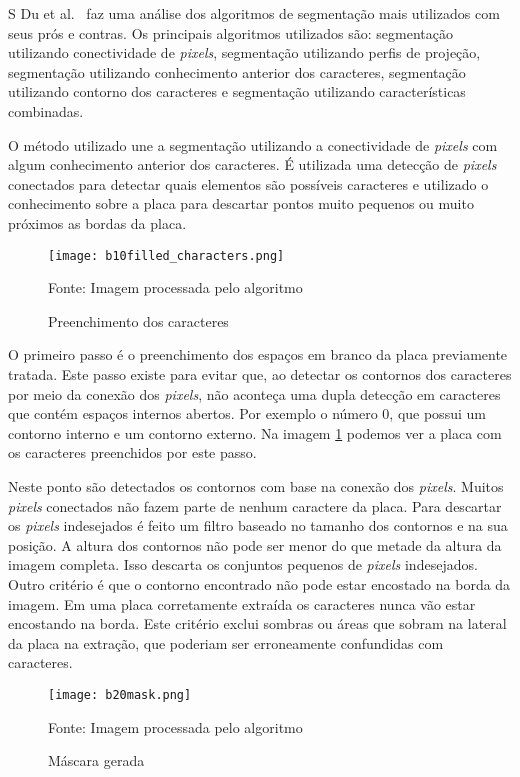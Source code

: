 S Du et al.~\cite{s2013automatic} faz uma análise dos algoritmos de segmentação mais
utilizados com seus prós e contras.  Os principais algoritmos utilizados são:
segmentação utilizando conectividade de \emph{pixels}, segmentação utilizando
perfis de projeção, segmentação utilizando conhecimento anterior dos caracteres,
segmentação utilizando contorno dos caracteres e segmentação utilizando
características combinadas.

O método utilizado une a segmentação utilizando a conectividade de \emph{pixels} com algum conhecimento anterior dos caracteres. É utilizada uma detecção de \emph{pixels} conectados para detectar quais elementos são possíveis caracteres e utilizado o conhecimento sobre a placa para descartar pontos muito pequenos ou muito próximos as bordas da placa.

\begin{figure}[H]
	\centering
	\texttt{[image: b10filled\_characters.png]}
	\caption{Preenchimento dos caracteres}
Fonte: Imagem processada pelo algoritmo
	\label{fig:preenchimento}
\end{figure}

O primeiro passo é o preenchimento dos espaços em branco da placa previamente tratada. Este passo existe para evitar que, ao detectar os contornos dos caracteres por meio da conexão dos \emph{pixels}, não aconteça uma dupla detecção em caracteres que contém espaços internos abertos. Por exemplo o número 0, que possui um contorno interno e um contorno externo. Na imagem \ref{fig:preenchimento} podemos ver a placa com os caracteres preenchidos por este passo.

Neste ponto são detectados os contornos com base na conexão dos \emph{pixels}. Muitos \emph{pixels} conectados não fazem parte de nenhum caractere da placa. Para descartar os \emph{pixels} indesejados é feito um filtro baseado no tamanho dos contornos e na sua posição. A altura dos contornos não pode ser menor do que metade da altura da imagem completa. Isso descarta os conjuntos pequenos de \emph{pixels} indesejados. Outro critério é que o contorno encontrado não pode estar encostado na borda da imagem. Em uma placa corretamente extraída os caracteres nunca vão estar encostando na borda. Este critério exclui sombras ou áreas que sobram na lateral da placa na extração, que poderiam ser erroneamente confundidas com caracteres.

\begin{figure}[H]
	\centering
	\texttt{[image: b20mask.png]}
	\caption{Máscara gerada}
Fonte: Imagem processada pelo algoritmo
	\label{fig:mascara}
\end{figure}

